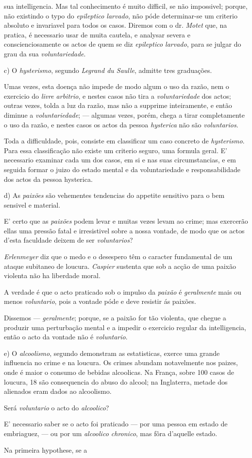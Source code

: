 sua intelligencia. Mas tal conhecimento é muito difficil, se não impossivel; porque, não existindo o typo do \emph{epileptico larvado}, não póde determinar-se um criterio absoluto e invariavel para todos os casos. Diremos com o dr. \emph{Motet} que, na pratica, é necessario usar de muita cautela, e analysar severa e conscienciosamente os actos de quem se diz \emph{epileptico larvado}, para se julgar do grau da sua \emph{voluntariedade}.\par c) O \emph{hysterismo}, segundo \emph{Legrand du Saulle}, admitte tres graduações.\par Umas vezes, esta doença não impede de modo algum o uso da razão, nem o exercicio do \emph{livre arbitrio}, e nestes casos não tira a \emph{voluntariedade} dos actos; outras vezes, tolda a luz da razão, mas não a supprime inteiramente, e então diminue a \emph{voluntariedade}; --- algumas vezes, porém, chega a tirar completamente o uso da razão, e nestes casos os actos da pessoa \emph{hysterica} não são \emph{voluntarios}.\par Toda a difficuldade, pois, consiste em classificar um caso concreto de \emph{hysterismo}. Para essa classificação não existe um criterio seguro, uma formula geral. E' necessario examinar cada um dos casos, em si e nas suas circumstancias, e em seguida formar o juizo do estado mental e da voluntariedade e responsabilidade dos actos da pessoa hysterica.\par d) As \emph{paixões} são vehementes tendencias do appetite sensitivo para o bem sensivel e material.\par E' certo que as \emph{paixões} podem levar e muitas vezes levam ao crime; mas exercerão ellas uma pressão fatal e irresistivel sobre a nossa vontade, de modo que os actos d'esta faculdade deixem de ser \emph{voluntarios}?\par \emph{Erlenmeyer} diz que o medo e o desespero têm o caracter fundamental de um ataque subitaneo de loucura. \emph{Caspier} sustenta que sob a acção de uma paixão violenta não ha liberdade moral.\par A verdade é que o acto praticado sob o impulso da \emph{paixão} é \emph{geralmente} mais ou menos \emph{voluntario}, pois a vontade póde e deve resistir ás paixões.\par Dissemos --- \emph{geralmente}; porque, se a paixão for tão violenta, que chegue a produzir uma perturbação mental e a impedir o exercicio regular da intelligencia, então o acto da vontade não é \emph{voluntario}.\par e) O \emph{alcoolismo}, segundo demonstram as estatisticas, exerce uma grande influencia no crime e na loucura. Os crimes abundam notavelmente nos paizes, onde é maior o consumo de bebidas alcoolicas. Na França, sobre 100 casos de loucura, 18 são consequencia do abuso do alcool; na Inglaterra, metade dos alienados eram dados ao alcoolismo.\par Será \emph{voluntario} o acto do \emph{alcoolico}?\par E' necessario saber se o acto foi praticado --- por uma pessoa em estado de embriaguez, --- ou por um \emph{alcoolico chronico}, mas fôra d'aquelle estado.\par Na primeira hypothese, se a 
